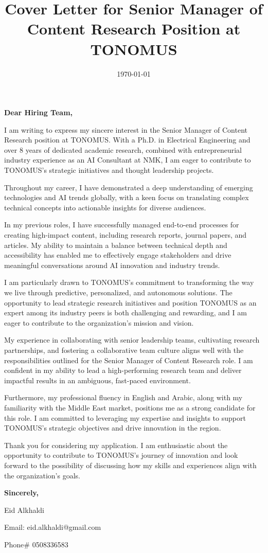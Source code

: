 \documentclass[11pt]{article}
\date{\today}
\title{Cover Letter for Senior Manager of Content Research Position at TONOMUS}
\begin{document}
\maketitle
\textbf{Dear Hiring Team,}

I am writing to express my sincere interest in the Senior Manager of Content Research position at TONOMUS. With a Ph.D. in Electrical Engineering and over 8 years of dedicated academic research, combined with entrepreneurial industry experience as an AI Consultant at NMK, I am eager to contribute to TONOMUS's strategic initiatives and thought leadership projects.

Throughout my career, I have demonstrated a deep understanding of emerging technologies and AI trends globally, with a keen focus on translating complex technical concepts into actionable insights for diverse audiences.

In my previous roles, I have successfully managed end-to-end processes for creating high-impact content, including research reports, journal papers, and articles. My ability to maintain a balance between technical depth and accessibility has enabled me to effectively engage stakeholders and drive meaningful conversations around AI innovation and industry trends.

I am particularly drawn to TONOMUS's commitment to transforming the way we live through predictive, personalized, and autonomous solutions. The opportunity to lead strategic research initiatives and position TONOMUS as an expert among its industry peers is both challenging and rewarding, and I am eager to contribute to the organization's mission and vision.

My experience in collaborating with senior leadership teams, cultivating research partnerships, and fostering a collaborative team culture aligns well with the responsibilities outlined for the Senior Manager of Content Research role. I am confident in my ability to lead a high-performing research team and deliver impactful results in an ambiguous, fast-paced environment.

Furthermore, my professional fluency in English and Arabic, along with my familiarity with the Middle East market, positions me as a strong candidate for this role. I am committed to leveraging my expertise and insights to support TONOMUS's strategic objectives and drive innovation in the region.

Thank you for considering my application. I am enthusiastic about the opportunity to contribute to TONOMUS's journey of innovation and look forward to the possibility of discussing how my skills and experiences align with the organization's goals.

\textbf{Sincerely,}

Eid Alkhaldi 

Email: eid.alkhaldi@gmail.com

Phone\# 0508336583
\end{document}
